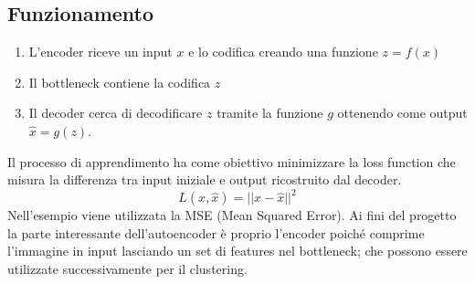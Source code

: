 \subsection{Funzionamento}
\begin{enumerate}
    \item L'encoder riceve un input \( x \) e lo codifica creando una funzione \( z= f(x) \)
    \item Il bottleneck contiene la codifica \( z \)
    \item Il decoder cerca di decodificare \( z \) tramite la funzione \( g \) ottenendo come output \( \hat{x} = g(z) \).
\end{enumerate}
Il processo di apprendimento ha come obiettivo minimizzare la loss function che misura la differenza tra input iniziale e output ricostruito dal decoder.
\[ L(x, \hat{x}) = ||x - \hat{x}||^2 \]
Nell'esempio viene utilizzata la MSE (Mean Squared Error).
Ai fini del progetto la parte interessante dell'autoencoder è proprio l'encoder poiché comprime l'immagine in input lasciando un set di features nel bottleneck; che possono essere utilizzate successivamente per il clustering.








